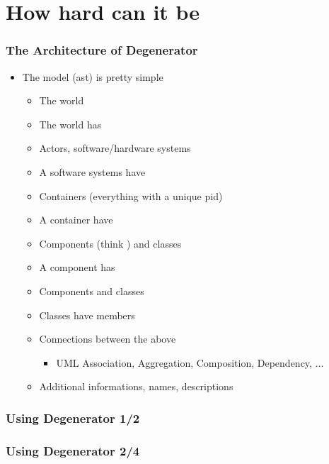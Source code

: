 \documentclass[xelatex,10pt]{beamer}
\begin{document}
\section{How hard can it be}
\begin{frame}
	\frametitle{The Architecture of Degenerator}
	\begin{itemize}
		\item The model (ast) is pretty simple
			\pause
		\begin{itemize}
			\item The world
			\item The world has
			\item Actors, software/hardware systems
			\item A software systems have
			\item Containers (everything with a unique pid)
			\item A container have
			\item Components (think \lstinline@module@) and classes
			\item A component has
			\item Components and classes
			\item Classes have members
				\pause
			\item Connections between the above
			\begin{itemize}
				\item UML Association, Aggregation, Composition, Dependency, \(\dots\)
			\end{itemize}
			\item Additional informations, names, descriptions
		\end{itemize}
	\end{itemize}
\end{frame}

\begin{frame}
	\frametitle{Using Degenerator 1/2}
	
\end{frame}
\begin{frame}
	\frametitle{Using Degenerator 2/4}
	
	\vfill
	\pause
	
\end{frame}
\end{document}
